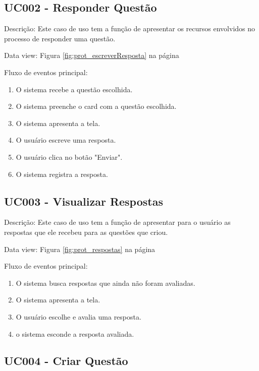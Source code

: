 \subsection*{UC002 - Responder Questão}

Descrição: Este caso de uso tem a função de apresentar os recursos envolvidos no processo de responder uma questão.

Data view: Figura \ref{fig:prot_escreverResposta} na página \pageref{fig:prot_escreverResposta}

Fluxo de eventos principal:

\begin{enumerate}

\item O sistema recebe a questão escolhida.
\item O sistema preenche o card com a questão escolhida.
\item O sistema apresenta a tela.
\item O usuário escreve uma resposta.
\item O usuário clica no botão "Enviar".
\item O sistema registra a resposta.

\end{enumerate}

\subsection*{UC003 - Visualizar Respostas}

Descrição: Este caso de uso tem a função de apresentar para o usuário as respostas que ele recebeu para as questões que criou.

Data view: Figura \ref{fig:prot_respostas} na página \pageref{fig:prot_respostas}

Fluxo de eventos principal:

\begin{enumerate}

\item O sistema busca respostas que ainda não foram avaliadas.
\item O sistema apresenta a tela.
\item O usuário escolhe e avalia uma resposta.
\item o sistema esconde a resposta avaliada.

\end{enumerate}

\subsection*{UC004 - Criar Questão}

